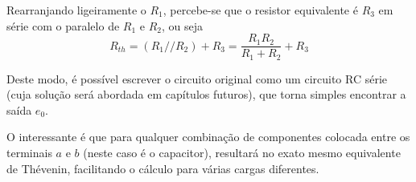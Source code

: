 \documentclass{article}
\numberwithin{equation}{section}
\newlength\Colsep
\begin{document}
\noindent\begin{minipage}{\textwidth}
\begin{minipage}[c][4cm][c]{\dimexpr0.5\textwidth-0.5\Colsep\relax}
    \begin{center}
    \end{center}
\end{minipage}
\begin{minipage}[c][4cm][c]{\dimexpr0.5\textwidth-0.5\Colsep\relax}
    Rearranjando ligeiramente o $R_1$, percebe-se que o resistor equivalente é $R_3$ em série com o paralelo de $R_1$ e $R_2$, ou seja
    $$R_{th}=(R_1//R_2)+R_3=\frac{R_1R_2}{R_1+R_2}+R_3$$
\end{minipage}
\end{minipage}

\noindent\begin{minipage}{\textwidth}
\begin{minipage}[c][4cm][c]{\dimexpr0.5\textwidth-0.5\Colsep\relax}
    \begin{center}
    \end{center}
\end{minipage}
\begin{minipage}[c][4cm][c]{\dimexpr0.5\textwidth-0.5\Colsep\relax}
    Deste modo, é possível escrever o circuito original como um circuito RC série (cuja solução será abordada em capítulos futuros), que torna simples encontrar a saída $e_0$.
\end{minipage}
\end{minipage}

O interessante é que para qualquer combinação de componentes colocada entre os terminais $a$ e $b$ (neste caso é o capacitor), resultará no exato mesmo equivalente de Thévenin, facilitando o cálculo para várias cargas diferentes.
\end{document}
